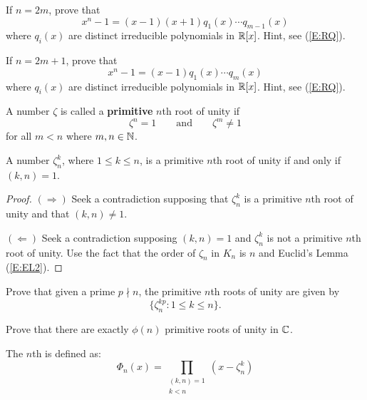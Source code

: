 \documentclass{ximera}
\begin{document}
\begin{exercise}
If $n = 2m$, prove that 
\[
x^n -1 = (x-1)(x+1)q_1(x) \cdots q_{m-1}(x)
\]
where $q_i(x)$ are distinct irreducible polynomials in $\mathbb R[x]$. Hint, see (\ref{E:RQ}).
\end{exercise}

\begin{exercise}
If $n = 2m+1$, prove that 
\[
x^n -1 = (x-1)q_1(x) \cdots q_{m}(x)
\]
where $q_i(x)$ are distinct irreducible polynomials in $\mathbb R[x]$. Hint, see (\ref{E:RQ}).
\end{exercise}


\begin{definition} 
A number $\zeta$ is called a \textbf{primitive} $n$th root of unity if
\[
\zeta^n = 1 \qquad\text{and}\qquad \zeta^{m} \ne 1
\]
for all $m< n$ where $m,n\in\mathbb N$.
\end{definition}


\begin{theorem} 
A number $\zeta_n^k$, where $1\le k\le n$, is a primitive $n$th root
of unity if and only if $(k,n) = 1$.

\begin{proof} 
$(\Rightarrow)$ Seek a contradiction supposing that $\zeta_n^k$ is a
  primitive $n$th root of unity and that $(k,n) \ne 1$.

$(\Leftarrow)$ Seek a contradiction supposing $(k,n) = 1$ and
  $\zeta_n^k$ is not a primitive $n$th root of unity. Use the fact
  that the order of $\zeta_n$ in $K_n$ is $n$ and Euclid's Lemma
  (\ref{E:EL2}).
\end{proof}
\end{theorem}



\begin{exercise}\label{E:KP}
Prove that given a prime $p\nmid n$, the primitive $n$th roots of
unity are given by
\[
\{\zeta_n^{kp}: 1\le k \le n\}.
\]
\end{exercise}


\begin{exercise}
Prove that there are exactly $\phi(n)$ primitive roots of unity in
$\mathbb C$.
\end{exercise}



\begin{definition}
The $n$th  is defined as:
\[
\Phi_n(x) = \prod_{\substack{(k,n)=1 \\ k<n}}(x-\zeta_n^k)
\]
\end{definition}
\end{document}
